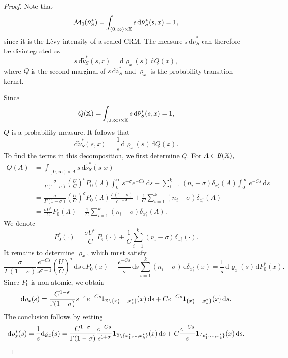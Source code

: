 \begin{proof}
Note that
\[
\mathcal{M}_1\!\left(\tilde{\nu}^*_{S}\right) = \int_{(0, \infty)\times \mathbb{X}}s\,\mathrm{d}\tilde{\nu}^*_{S}(s,x) = 1,
\]
since it is the L\'evy intensity of a scaled CRM. The measure $s\,\mathrm{d}\tilde{\nu}^*_{S}$ can therefore be disintegrated as
\[
s\,\mathrm{d}\tilde{\nu}^*_{S}(s,x) = \mathrm{d}\varrho_x(s)\,\mathrm{d}Q(x),
\]
where $Q$ is the second marginal of $s\,\mathrm{d}\tilde{\nu}^*_{S}$ and $\varrho_x$ is the probability transition kernel.

Since
\[
Q(\mathbb{X}) = \int_{(0,\infty)\times \mathbb{X}}s\,\mathrm{d}\tilde{\nu}^*_{S}(s,x) = 1,
\]
$Q$ is a probability measure. It follows that
\[
\mathrm{d}\tilde{\nu}^*_{S}(s,x) = \frac{1}{s}\,\mathrm{d}\varrho_x(s)\,\mathrm{d}Q(x).
\]
To find the terms in this decomposition, we first determine $Q$. For $A \in \mathcal{B}(\mathbb{X}),$
\begin{align*}
    Q(A) &= \int_{(0,\infty)\times A}s\,\mathrm{d}\tilde{\nu}^*_{S}(s,x) \\
    & = \frac{\sigma}{\Gamma(1-\sigma)}\left( \frac{U}{C} \right)^\sigma P_0(A) \int_0^\infty s^{-\sigma}e^{-Cs}\,\mathrm{d}s
    + \sum_{i = 1}^k (n_i - \sigma) \delta_{x_i^*}(A) \int_0^\infty e^{-Cs}\,\mathrm{d}s \\
    &= \frac{\sigma}{\Gamma(1-\sigma)}\left( \frac{U}{C}\right)^\sigma P_0(A) \frac{\Gamma(1-\sigma)}{C^{1-\sigma}}
    + \frac{1}{C} \sum_{i = 1}^k(n_i - \sigma)\delta_{x_i^*}(A) \\
    & = \frac{\sigma U^\sigma}{C} P_0(A) + \frac{1}{C}\sum_{i = 1}^k (n_i - \sigma) \delta_{x_i^*}(A).
\end{align*}
We denote
\[
P_0^*(\cdot) = \frac{\sigma U^\sigma}{C} P_0(\cdot) + \frac{1}{C}\sum_{i = 1}^k (n_i - \sigma) \delta_{x_i^*}(\cdot).
\]
It remains to determine $\varrho_x$, which must satisfy
\[
\frac{\sigma}{\Gamma(1-\sigma)}\frac{e^{-Cs}}{s^{\sigma+1}}\left( \frac{U}{C} \right)^\sigma\,\mathrm{d}s\,\mathrm{d}P_0(x) +
\frac{e^{-Cs}}{s}\,\mathrm{d}s\sum_{i = 1}^k(n_i - \sigma)\,\mathrm{d}\delta_{x_i^*}(x) = \frac{1}{s}\,\mathrm{d}\varrho_x(s)\,\mathrm{d}P^*_0(x).
\]
Since $P_0$ is non-atomic, we obtain
\[
\mathrm{d}\varrho_x(s) = \frac{C^{1-\sigma}}{\Gamma(1-\sigma)}s^{-\sigma}e^{-Cs}\mathbf{1}_{\mathbb{X} \setminus\{x_1^*,\dots, x_k^*\}}(x)\,\mathrm{d}s +
Ce^{-Cs}\mathbf{1}_{\{x_1^*,\dots, x_k^*\}}(x)\,\mathrm{d}s.
\]
The conclusion follows by setting
\[
\mathrm{d}\rho_x^*(s) = \frac{1}{s}\mathrm{d}\varrho_x(s) = \frac{C^{1-\sigma}}{\Gamma(1-\sigma)}\frac{e^{-Cs}}{s^{1+\sigma}}\mathbf{1}_{\mathbb{X} \setminus\{x_1^*,\dots, x_k^*\}}(x)\,\mathrm{d}s + C\frac{e^{-Cs}}{s}\mathbf{1}_{\{x_1^*,\dots, x_k^*\}}(x)\,\mathrm{d}s.
\]
\end{proof}


